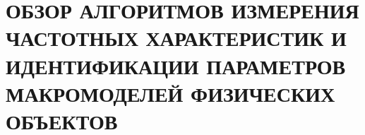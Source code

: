 \chapter{ОБЗОР АЛГОРИТМОВ ИЗМЕРЕНИЯ ЧАСТОТНЫХ ХАРАКТЕРИСТИК И ИДЕНТИФИКАЦИИ ПАРАМЕТРОВ МАКРОМОДЕЛЕЙ ФИЗИЧЕСКИХ ОБЪЕКТОВ}



